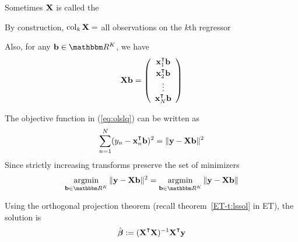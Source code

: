 \begin{frame}

    \vspace{2em}
    Sometimes $\mathbf X$ is called the 
    
    By construction, $\operatorname{col}_k \mathbf X =$ all observations on the $k$th regressor
    
    \vspace{.7em}
    Also, for any $\boldb \in \RR^K$, we have
    \begin{equation*}
        \boldX \boldb = 
        \left(
        \begin{array}{c}
            \boldx_1^\T \boldb \vspace{0.2em} \\
            \boldx_2^\T \boldb\\
            \vdots \\
            \boldx_N^\T \boldb
        \end{array}
        \right)
    \end{equation*}
%
\end{frame}

\begin{frame}

    \vspace{2em}
    The objective function in (\ref{eq:olslq}) can be written as 
    \begin{equation*}
         \sum_{n=1}^N (y_n - \boldx_n^\T \boldb)^2 
            = \| \boldy - \boldX \boldb \|^2
    \end{equation*}
    Since strictly increasing transforms preserve the set of minimizers 
    \begin{equation}
        \label{eq:olses}
        \argmin_{\boldb \in \RR^K} \| \boldy - \boldX \boldb \|^2
         = \argmin_{\boldb \in \RR^K} \| \boldy - \boldX \boldb \|
    \end{equation}
    
    Using the orthogonal projection theorem (recall theorem~\ref{ET-t:lssol} in ET), the
    solution is
    \begin{equation}
        \label{eq:thelsqe}
        \hboldbeta := (\boldX^\T \boldX)^{-1} \boldX^\T \boldy
    \end{equation}
\end{frame}

